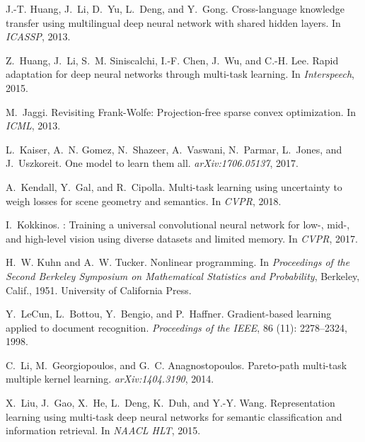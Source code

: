 \documentclass{article}
\begin{document}
{\begin{thebibliography}{60}
J.-T. Huang, J.~Li, D.~Yu, L.~Deng, and Y.~Gong.
\newblock Cross-language knowledge transfer using multilingual deep neural
  network with shared hidden layers.
\newblock In \emph{ICASSP}, 2013.

Z.~Huang, J.~Li, S.~M. Siniscalchi, I.-F. Chen, J.~Wu, and C.-H. Lee.
\newblock Rapid adaptation for deep neural networks through multi-task
  learning.
\newblock In \emph{Interspeech}, 2015.

M.~Jaggi.
\newblock Revisiting {Frank-Wolfe}: Projection-free sparse convex optimization.
\newblock In \emph{{ICML}}, 2013.

L.~Kaiser, A.~N. Gomez, N.~Shazeer, A.~Vaswani, N.~Parmar, L.~Jones, and
  J.~Uszkoreit.
\newblock One model to learn them all.
\newblock \emph{arXiv:1706.05137}, 2017.

A.~Kendall, Y.~Gal, and R.~Cipolla.
\newblock Multi-task learning using uncertainty to weigh losses for scene
  geometry and semantics.
\newblock In \emph{{CVPR}}, 2018.

I.~Kokkinos.
: Training a universal convolutional neural network for
  low-, mid-, and high-level vision using diverse datasets and limited memory.
\newblock In \emph{CVPR}, 2017.

H.~W. Kuhn and A.~W. Tucker.
\newblock Nonlinear programming.
\newblock In \emph{Proceedings of the Second Berkeley Symposium on Mathematical
  Statistics and Probability}, Berkeley, Calif., 1951. University of California
  Press.

Y.~LeCun, L.~Bottou, Y.~Bengio, and P.~Haffner.
\newblock Gradient-based learning applied to document recognition.
\newblock \emph{Proceedings of the IEEE}, 86 (11):
  2278--2324, 1998.

C.~Li, M.~Georgiopoulos, and G.~C. Anagnostopoulos.
\newblock Pareto-path multi-task multiple kernel learning.
\newblock \emph{arXiv:1404.3190}, 2014.

X.~Liu, J.~Gao, X.~He, L.~Deng, K.~Duh, and Y.-Y. Wang.
\newblock Representation learning using multi-task deep neural networks for
  semantic classification and information retrieval.
\newblock In \emph{NAACL HLT}, 2015{}.


\end{thebibliography}}
\end{document}
